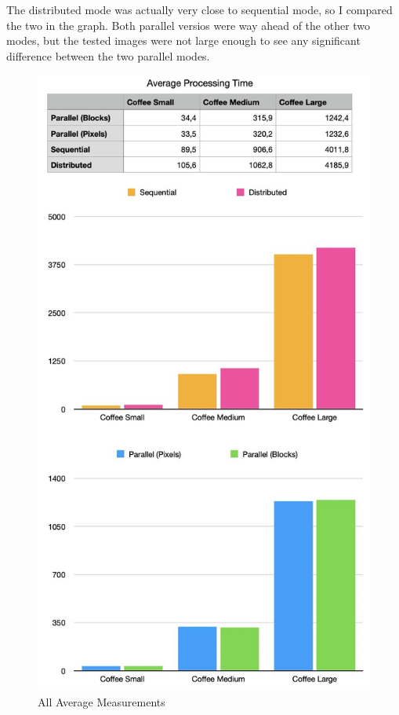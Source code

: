 \documentclass{article}
\begin{document}
\begin{multicols}{2}
    The distributed mode was actually very close to sequential mode, so I compared the two in the graph. Both parallel versios were way ahead of the other two modes, but the tested images were not large enough to see any significant difference between the two parallel modes.

    \begin{figure}[H]
        \centering
        \includegraphics[width=\linewidth]{img/average_detailed.jpg}
        \caption{All Average Measurements}
        \label{fig:distributed}
    \end{figure}


\end{multicols}
\end{document}
